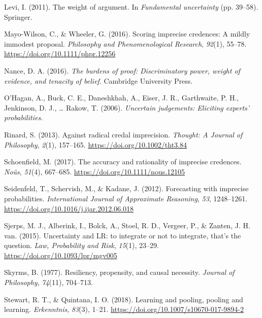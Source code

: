 \documentclass[
  10pt,
  dvipsnames,enabledeprecatedfontcommands]{scrartcl}
\newlength{\cslhangindent}
\newlength{\cslentryspacingunit} %
\newenvironment{CSLReferences}[2] %
 {%
  \setlength{\parindent}{0pt}
  \ifodd #1
  \let\oldpar\par
  \def\par{\hangindent=\cslhangindent\oldpar}
  \fi
  \setlength{\parskip}{#2\cslentryspacingunit}
 }%
 {}
\begin{document}
\begin{CSLReferences}{1}{0}
\leavevmode{}%
Levi, I. (2011). The weight of argument. In \emph{Fundamental
uncertainty} (pp. 39--58). Springer.

\leavevmode{}%
Mayo-Wilson, C., \& Wheeler, G. (2016). Scoring imprecise credences: A
mildly immodest proposal. \emph{Philosophy and Phenomenological
Research}, \emph{92}(1), 55--78.
\url{https://doi.org/10.1111/phpr.12256}

\leavevmode{}%
Nance, D. A. (2016). \emph{The burdens of proof: Discriminatory power,
weight of evidence, and tenacity of belief}. Cambridge University Press.

\leavevmode{}%
O'Hagan, A., Buck, C. E., Daneshkhah, A., Eiser, J. R., Garthwaite, P.
H., Jenkinson, D. J., \ldots{} Rakow, T. (2006). \emph{Uncertain
judgements: Eliciting experts' probabilities}.

\leavevmode{}%
Rinard, S. (2013). Against radical credal imprecision. \emph{Thought: A
Journal of Philosophy}, \emph{2}(1), 157--165.
\url{https://doi.org/10.1002/tht3.84}

\leavevmode{}%
Schoenfield, M. (2017). The accuracy and rationality of imprecise
credences. \emph{Noûs}, \emph{51}(4), 667--685.
\url{https://doi.org/10.1111/nous.12105}

\leavevmode{}%
Seidenfeld, T., Schervish, M., \& Kadane, J. (2012). Forecasting with
imprecise probabilities. \emph{International Journal of Approximate
Reasoning}, \emph{53}, 1248--1261.
\url{https://doi.org/10.1016/j.ijar.2012.06.018}

\leavevmode{}%
Sjerps, M. J., Alberink, I., Bolck, A., Stoel, R. D., Vergeer, P., \&
Zanten, J. H. van. (2015). {Uncertainty and LR: to integrate or not to
integrate, that's the question}. \emph{Law, Probability and Risk},
\emph{15}(1), 23--29. \url{https://doi.org/10.1093/lpr/mgv005}

\leavevmode{}%
Skyrms, B. (1977). Resiliency, propensity, and causal necessity.
\emph{Journal of Philosophy}, \emph{74}(11), 704--713.

\leavevmode{}%
Stewart, R. T., \& Quintana, I. O. (2018). Learning and pooling, pooling
and learning. \emph{Erkenntnis}, \emph{83}(3), 1--21.
\url{https://doi.org/10.1007/s10670-017-9894-2}


\end{CSLReferences}
\end{document}
